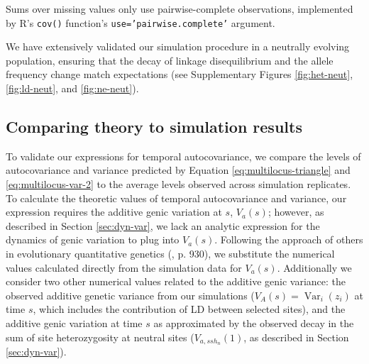 \documentclass[11pt]{article}
\DeclareMathOperator{\var}{Var}
\begin{document}
Sums over missing values only use pairwise-complete observations, implemented
by R's \texttt{cov()} function's \texttt{use='pairwise.complete'} argument.

We have extensively validated our simulation procedure in a neutrally evolving
population, ensuring that the decay of linkage disequilibrium and the allele
frequency change match expectations (see Supplementary Figures
\ref{fig:het-neut}, \ref{fig:ld-neut}, and \ref{fig:ne-neut}). 


\subsection{Comparing theory to simulation results}
\label{sec:ml-sim-res}

To validate our expressions for temporal autocovariance, we compare the levels
of autocovariance and variance predicted by Equation
\eqref{eq:multilocus-triangle} and \eqref{eq:multilocus-var-2} to the average
levels observed across simulation replicates. To calculate the theoretic values
of temporal autocovariance and variance, our expression requires the additive
genic variation at $s$, $V_a(s)$; however, as described in Section
\ref{sec:dyn-var}, we lack an analytic expression for the dynamics of genic
variation to plug into $V_a(s)$.  Following the approach of others in
evolutionary quantitative genetics (\cite{Turelli1994-rd}, p. 930), we
substitute the numerical values calculated directly from the simulation data
for $V_a(s)$. Additionally we consider two other numerical values related to
the additive genic variance: the observed additive genetic variance from our
simulations ($V_A(s) = \var_i(z_i)$ at time $s$, which includes the
contribution of LD between selected sites), and the additive genic variation at
time $s$ as approximated by the observed decay in the sum of site
heterozygosity at neutral sites ($V_{a,ssh_n}(1)$, as described in Section
\ref{sec:dyn-var}). 
\end{document}
